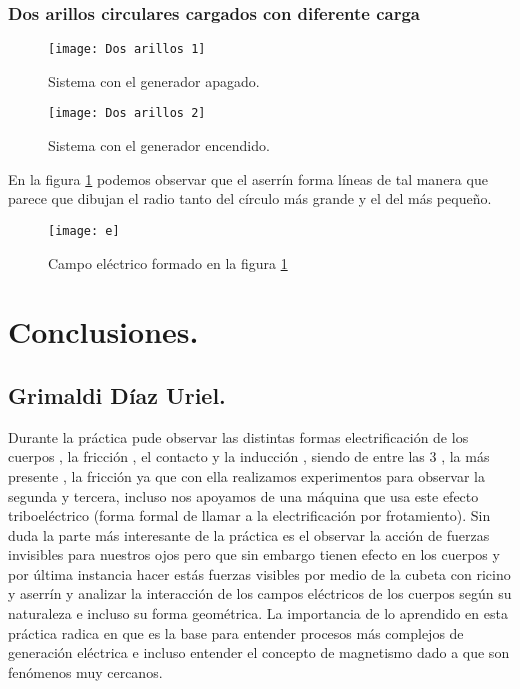 \documentclass[spanish,10pt,a4paper,onecolumn]{article}
\begin{document}
\newpage
\subsubsection{Dos arillos circulares cargados con diferente carga}

\begin{figure}[h!]
	\centering
	\texttt{[image: Dos arillos 1]}
	\caption{Sistema con el generador apagado.}
\end{figure}

\begin{figure}[h!]
	\centering
	\texttt{[image: Dos arillos 2]}
	\caption{Sistema con el generador encendido.}
	\label{fig:DosArillos}
\end{figure}

En la figura \ref{fig:DosArillos} podemos observar que el aserrín forma líneas de tal manera que parece que dibujan el radio tanto del círculo más grande y el del más pequeño.

\begin{figure}[h!]
	\centering
	\texttt{[image: e]}
	\caption{Campo eléctrico formado en la figura \ref{fig:DosArillos}}
\end{figure}


\newpage
\section{Conclusiones.}
\subsection{Grimaldi Díaz Uriel.}

Durante la práctica pude observar las distintas formas electrificación de los cuerpos , la fricción , el contacto y la inducción , siendo de entre las 3 , la más presente , la fricción ya que con ella realizamos experimentos para observar la segunda y tercera, incluso nos apoyamos de una máquina que usa este efecto triboeléctrico (forma formal de llamar a la electrificación por frotamiento). Sin duda la parte más interesante de la práctica es el observar la acción de fuerzas invisibles para nuestros ojos pero que sin embargo tienen efecto en los cuerpos y por última instancia hacer estás fuerzas visibles por medio de la cubeta con ricino y aserrín y analizar la interacción de los campos eléctricos de los cuerpos según su naturaleza e incluso su forma geométrica. La importancia de lo aprendido en esta práctica radica en que es la base para entender procesos más complejos de generación eléctrica e incluso entender el concepto de magnetismo dado a que son fenómenos muy cercanos.
\end{document}
